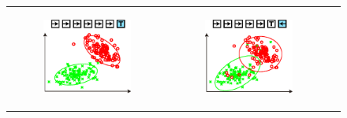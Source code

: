 \documentclass[letterpaper]{article}
\begin{document}
\begin{figure}[!ht]
\centering
    \begin{tabular}{c|c|c}
        \begin{subfigure}[t]{0.29\columnwidth}
            \begin{flushleft}
            \includegraphics[width=\columnwidth]{img/GM1}
            \caption{}
            \label{fig:GM1}
            \end{flushleft}
        \end{subfigure}
        &
        \begin{subfigure}[t]{0.29\columnwidth}
            \begin{center}
            \includegraphics[width=\columnwidth]{img/GM2}

\end{center}
\end{subfigure}
\end{tabular}
\end{figure}
\end{document}
